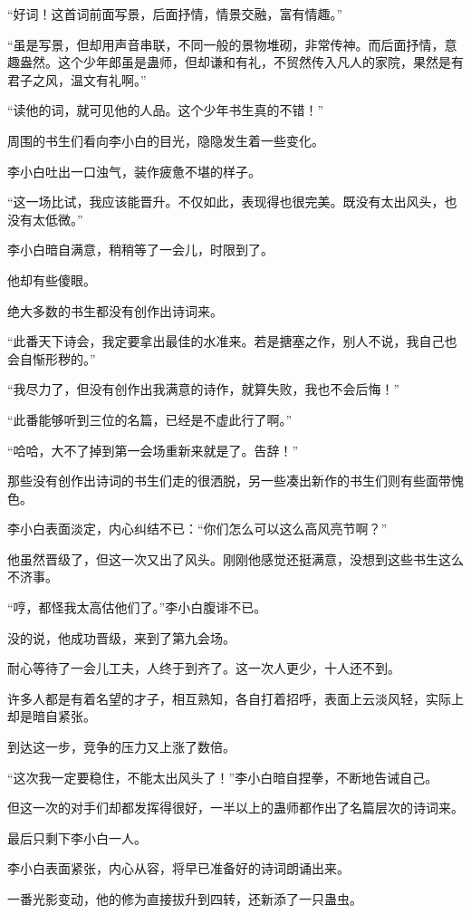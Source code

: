 \begin{this_body}
“好词！这首词前面写景，后面抒情，情景交融，富有情趣。”

“虽是写景，但却用声音串联，不同一般的景物堆砌，非常传神。而后面抒情，意趣盎然。这个少年郎虽是蛊师，但却谦和有礼，不贸然传入凡人的家院，果然是有君子之风，温文有礼啊。”

“读他的词，就可见他的人品。这个少年书生真的不错！”

周围的书生们看向李小白的目光，隐隐发生着一些变化。

李小白吐出一口浊气，装作疲惫不堪的样子。

“这一场比试，我应该能晋升。不仅如此，表现得也很完美。既没有太出风头，也没有太低微。”

李小白暗自满意，稍稍等了一会儿，时限到了。

他却有些傻眼。

绝大多数的书生都没有创作出诗词来。

“此番天下诗会，我定要拿出最佳的水准来。若是搪塞之作，别人不说，我自己也会自惭形秽的。”

“我尽力了，但没有创作出我满意的诗作，就算失败，我也不会后悔！”

“此番能够听到三位的名篇，已经是不虚此行了啊。”

“哈哈，大不了掉到第一会场重新来就是了。告辞！”

那些没有创作出诗词的书生们走的很洒脱，另一些凑出新作的书生们则有些面带愧色。

李小白表面淡定，内心纠结不已：“你们怎么可以这么高风亮节啊？”

他虽然晋级了，但这一次又出了风头。刚刚他感觉还挺满意，没想到这些书生这么不济事。

“哼，都怪我太高估他们了。”李小白腹诽不已。

没的说，他成功晋级，来到了第九会场。

耐心等待了一会儿工夫，人终于到齐了。这一次人更少，十人还不到。

许多人都是有着名望的才子，相互熟知，各自打着招呼，表面上云淡风轻，实际上却是暗自紧张。

到达这一步，竞争的压力又上涨了数倍。

“这次我一定要稳住，不能太出风头了！”李小白暗自捏拳，不断地告诫自己。

但这一次的对手们却都发挥得很好，一半以上的蛊师都作出了名篇层次的诗词来。

最后只剩下李小白一人。

李小白表面紧张，内心从容，将早已准备好的诗词朗诵出来。

一番光影变动，他的修为直接拔升到四转，还新添了一只蛊虫。


\end{this_body}

